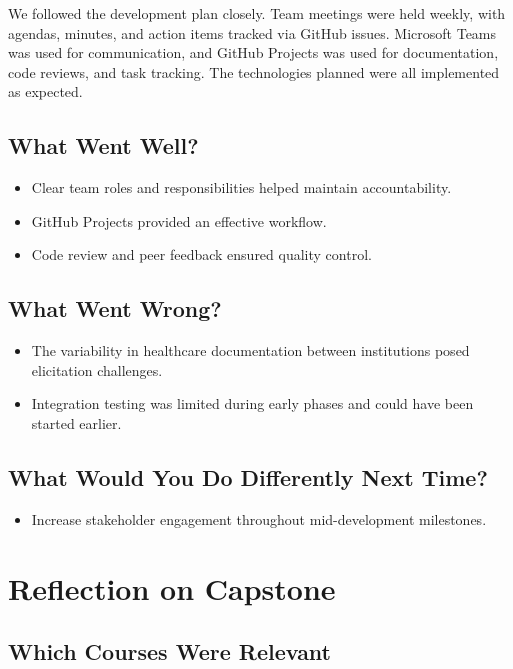 \documentclass{article}
\begin{document}
 We followed the development plan closely. Team meetings were held weekly, with agendas, minutes, and action items tracked via GitHub issues. Microsoft Teams was used for communication, and GitHub Projects was used for documentation, code reviews, and task tracking. The technologies planned were all implemented as expected.
 
 \subsection{What Went Well?}
 
 \begin{itemize}
     \item Clear team roles and responsibilities helped maintain accountability.
     \item GitHub Projects provided an effective workflow.
     \item Code review and peer feedback ensured quality control.
 \end{itemize}
 
 \subsection{What Went Wrong?}
 
 \begin{itemize}
     \item The variability in healthcare documentation between institutions posed elicitation challenges.
     \item Integration testing was limited during early phases and could have been started earlier.
 \end{itemize}
 
 \subsection{What Would You Do Differently Next Time?}
 
 \begin{itemize}
     \item Increase stakeholder engagement throughout mid-development milestones.
 \end{itemize}
 
 \section{Reflection on Capstone}
 
 \subsection{Which Courses Were Relevant}
 
\end{document}
